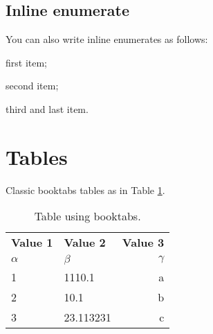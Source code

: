 \subsection{Inline enumerate}
You can also write inline enumerates as follows:
\begin{enumerate*}[label=(\roman*)]
    \item first item;
    \item second item;
    \item third and last item.
\end{enumerate*}

\section{Tables}
Classic booktabs tables as in Table \ref{tab:table}. \blindtext
\begin{table}
    \begin{center}
      \caption{Table using booktabs.}
      \label{tab:table}
      \begin{tabular}{llr}
        \toprule %
        \textbf{Value 1} & \textbf{Value 2} & \textbf{Value 3}\\
        $\alpha$ & $\beta$ & $\gamma$ \\
        \midrule %
        1 & 1110.1 & a\\
        2 & 10.1 & b\\
        3 & 23.113231 & c\\
        \bottomrule %
      \end{tabular}
    \end{center}
\end{table}

